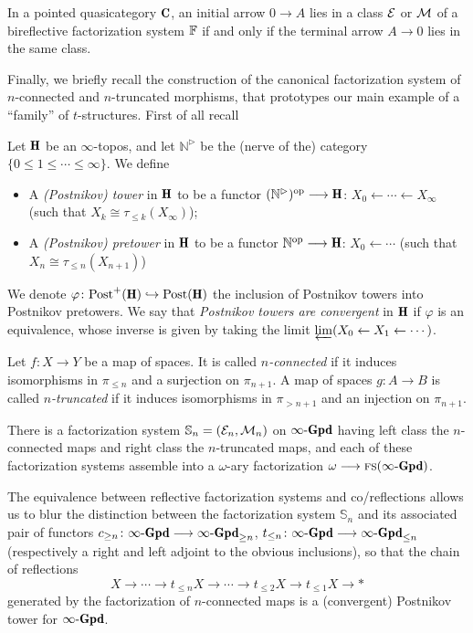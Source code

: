 \begin{lemma*}
In a pointed quasicategory $\C$, an initial arrow $0\to A$ lies in a class $\mathcal{E}$ or $\mathcal{M}$ of a bireflective factorization system $\mathbb{F}$ if and only if the terminal arrow $A\to 0$ lies in the same class.
\end{lemma*}
Finally, we briefly recall the construction of the canonical factorization system of $n$-connected and $n$-truncated morphisms, that prototypes our main example of a ``family'' of $t$-structures. First of all recall
\begin{definition}
\cite[5.5.6.23]{HTT}
Let $\H$ be an $\infty$-topos, and let $\mathbb{N}^\rhd$ be the (nerve of the) category $\{0\le 1\le \cdots \le \infty\}$. We define
\begin{itemize}
	\item A \emph{(Postnikov) tower} in $\H$ to be a functor $(\mathbb{N}^\rhd)^\opp \to \H$: $X_0\leftarrow \cdots \leftarrow X_\infty$ (such that $X_k \cong \tau_{\le k}(X_\infty)$);
	\item A \emph{(Postnikov) pretower} in $\H$ to be a functor $\mathbb{N}^\opp \to \H$: $X_0\leftarrow \cdots$ (such that $X_n\cong \tau_{\le n}(X_{n+1})$)
\end{itemize}
We denote $\varphi \colon \text{Post}^+(\H) \hookrightarrow \text{Post}(\H)$ the inclusion of Postnikov towers into Postnikov pretowers. We say that \emph{Postnikov towers are convergent} in $\H$ if $\varphi$ is an equivalence, whose inverse is given by taking the limit $\varprojlim (X_0\leftarrow X_1\leftarrow \cdots)$.
\end{definition}
\begin{definition}
Let $f\colon X\to Y$ be a map of spaces. It is called \emph{$n$-connected} if it induces isomorphisms in $\pi_{\le n}$ and a surjection on $\pi_{n+1}$. A map of spaces $g\colon A\to B$ is called \emph{$n$-truncated} if it induces isomorphisms in $\pi_{> n+1}$ and an injection on $\pi_{n+1}$.

There is a factorization system $\mathbb{S}_n = (\mathcal{E}_n,\mathcal{M}_n)$ on $\iGpd$ having left class the $n$-connected maps and right class the $n$-truncated maps, and each of these factorization systems assemble into a $\omega$-ary factorization $\omega \to \fs(\iGpd)$. 
\end{definition}
\begin{remark}
The equivalence between reflective factorization systems and co/reflections allows us to blur the distinction between the factorization system $\mathbb{S}_n$ and its associated pair of functors $c_{\ge n} \colon \iGpd \to \iGpd_{\ge n}$, $t_{\le n} \colon \iGpd \to \iGpd_{\le n}$ (respectively a right and left adjoint to the obvious inclusions), so that the chain of reflections 
\[
X \to \cdots \to t_{\le n}X \to \cdots \to t_{\le 2}X \to t_{\le 1}X\to *
\]
generated by the factorization of $n$-connected maps is a (convergent) Postnikov tower for $\iGpd$.
\end{remark}
